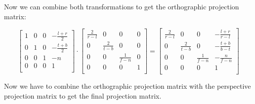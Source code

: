 \documentclass[12pt]{report} \usepackage{preamble}
\begin{document}
Now we can combine both transformations to get the orthographic projection matrix:

\[
	\begin{bmatrix}
		1 & 0 & 0 & -\frac{l + r}{2} \\
		0 & 1 & 0 & -\frac{t + b}{2} \\
		0 & 0 & 1 & -n               \\
		0 & 0 & 0 & 1                \\
	\end{bmatrix}
	\cdot
	\begin{bmatrix}
		\frac{2}{r - l} & 0               & 0               & 0 \\
		0               & \frac{2}{t - b} & 0               & 0 \\
		0               & 0               & \frac{1}{f - n} & 0 \\
		0               & 0               & 0               & 1 \\
	\end{bmatrix}
	=
	\begin{bmatrix}
		\frac{2}{r - l} & 0               & 0               & -\frac{l + r}{r - l} \\
		0               & \frac{2}{t - b} & 0               & -\frac{t + b}{b - t} \\
		0               & 0               & \frac{1}{f - n} & -\frac{n}{f - n}     \\
		0               & 0               & 0               & 1                    \\
	\end{bmatrix}
\]

Now we have to combine the orthographic projection matrix with the perspective projection matrix
to get the final projection matrix.
\end{document}
